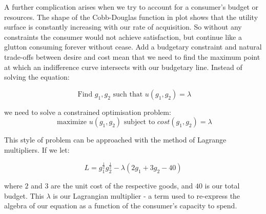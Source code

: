 \documentclass[]{tufte-book}
\theoremstyle{definition}
\theoremstyle{definition}
\theoremstyle{definition}
\theoremstyle{remark}
\begin{document}
A further complication arises when we try to account for a consumer's budget or resources. The shape of the Cobb-Douglas function in plot shows that the utility surface is constantly increasing with our rate of acquisition. So without any constraints the consumer would not achieve satisfaction, but continue like a glutton consuming forever without cease. Add a budgetary constraint and natural trade-offs between desire and cost mean that we need to find the maximum point at which an indifference curve intersects with our budgetary line. Instead of solving the equation:

\[ \text{ Find } g_{1}, g_{2} \text{ such that } u(g_{1}, g_{2}) = \lambda \]

we need to solve a constrained optimisation problem: \[ \text{ maximize } u(g_{1}, g_{2})  \text{ subject to } cost(g_{1}, g_{2}) =  \lambda\]

This style of problem can be approached with the method of Lagrange multipliers. If we let:

\[ L = g_{1}^{\frac{1}{2}}g_{2}^{\frac{1}{2}} - \lambda(2g_{1} + 3g_{2} - 40) \]

where \(2\) and \(3\) are the unit cost of the respective goods, and \(40\) is our total budget. This \(\lambda\) is our Lagrangian multiplier - a term used to re-express the algebra of our equation as a function of the consumer's capacity to spend.
\end{document}
